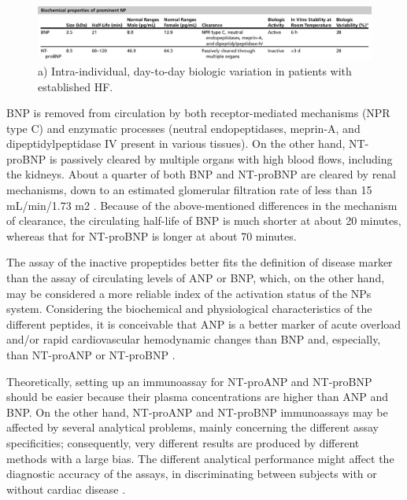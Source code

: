 \documentclass[14pt,a4paper,onecolumn]{extarticle}
\begin{document}
\begin{figure}   \includegraphics{../../images/NP_biochem.png}   \caption{a) Intra-individual, day-to-day biologic variation in patients with established HF. \citep{Gaggin2014}}   \label{NP_biochem} \end{figure}

BNP is removed from circulation by both receptor-mediated mechanisms (NPR type C) and enzymatic processes (neutral endopeptidases, meprin-A, and dipeptidylpeptidase IV present in various tissues). On the other hand, NT-proBNP is passively cleared by multiple organs with high blood flows, including the kidneys. About a quarter of both BNP and NT-proBNP are cleared by renal mechanisms, down to an estimated glomerular filtration rate of less than 15 mL/min/1.73 m2 . Because of the above-mentioned differences in the mechanism of clearance, the circulating half-life of BNP is much shorter at about 20 minutes, whereas that for NT-proBNP is longer at about 70 minutes. \citep{Gaggin2014}

The assay of the inactive propeptides better fits the definition of disease marker than the assay of circulating levels of ANP or BNP, which, on the other hand, may be considered a more reliable index of the activation status of the NPs system. Considering the biochemical and physiological characteristics of the different peptides, it is conceivable that ANP is a better marker of acute overload and/or rapid cardiovascular hemodynamic changes than BNP and, especially, than NT-proANP or NT-proBNP \citep{bib32} \citep{bib35}. %

Theoretically, setting up an immunoassay for NT-proANP and NT-proBNP should be easier because their plasma concentrations are higher than ANP and BNP.  On the other hand, NT-proANP and NT-proBNP immunoassays may be affected by several analytical problems, mainly concerning the different assay specificities; consequently, very different results are produced by different methods with a large bias. The different analytical performance might affect the diagnostic accuracy of the assays, in discriminating between subjects with or without cardiac disease \citep{bib32} \citep{bib35} \citep{bib36}. %
\end{document}
